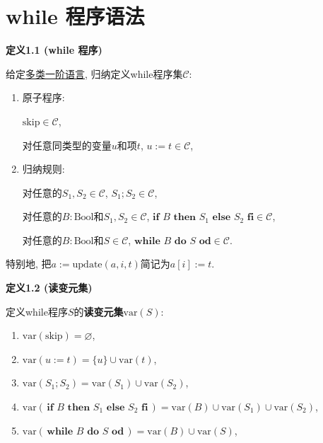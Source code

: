 \documentclass[UTF8]{ctexart}
\begin{document}
\setlength{\abovedisplayskip}{1pt}
\setlength{\belowdisplayskip}{1pt}

\section{while 程序语法}

\hypertarget{sec:定义1.1}{}
\noindent\textbf{定义1.1 (while 程序)}

给定\href{01 多类一阶语言#nameddest=sec:定义1.1}{多类一阶语言},
归纳定义while程序集$\mathcal{C}$:
\begin{enumerate}
    \item 原子程序:
    
    \hspace{3em}$\mathrm{skip}\in\mathcal{C}$,

    \hspace{3em}对任意同类型的变量$u$和项$t$, $u:=t\in\mathcal{C}$,

    \item 归纳规则:
    
    \hspace{3em}对任意的$S_1,S_2\in\mathcal{C}$, $S_1;S_2\in\mathcal{C}$,

    \hspace{3em}对任意的$B:\mathrm{Bool}$和$S_1,S_2\in\mathcal{C}$,
    $\mathbf{if}\,\,B\,\,\mathbf{then}\,\,S_1\,\,\mathbf{else}\,\,S_2
    \,\,\mathbf{fi}\in\mathcal{C}$,

    \hspace{3em}对任意的$B:\mathrm{Bool}$和$S\in\mathcal{C}$,
    $\mathbf{while}\,\,B\,\,\mathbf{do}\,\,S\,\,\mathbf{od}\in\mathcal{C}$.
\end{enumerate}

\vspace{10pt}

特别地, 把$a:=\mathrm{update}(a,i,t)$简记为$a[i]:=t$.

\vspace{30pt}

\hypertarget{sec:定义1.2}{}
\noindent\textbf{定义1.2 (读变元集)}

定义while程序$S$的\textbf{读变元集}$\mathrm{var}(S)$:
\begin{enumerate}
    \item $\mathrm{var}(\mathrm{skip})=\varnothing$,
    \item $\mathrm{var}(u:=t)=\{u\}\cup\mathrm{var}(t)$,
    \item $\mathrm{var}(S_1;S_2)=\mathrm{var}(S_1)\cup\mathrm{var}(S_2)$,
    \item $\mathrm{var}(\,\mathbf{if}\,\,B\,\,\mathbf{then}\,\,S_1\,\,
    \mathbf{else}\,\,S_2\,\,\mathbf{fi}\,)=\mathrm{var}(B)\cup
    \mathrm{var}(S_1)\cup\mathrm{var}(S_2)$,
    \item $\mathrm{var}(\,\mathbf{while}\,\,B\,\,\mathbf{do}\,\,S
    \,\,\mathbf{od}\,)=\mathrm{var}(B)\cup\mathrm{var}(S)$,
\end{enumerate}
\end{document}
